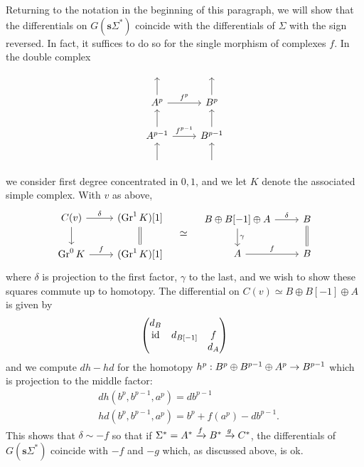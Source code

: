 \documentclass[deligne.tex]{subfiles}
\begin{document}
Returning to the notation in the beginning of this paragraph, we will show
that the differentials on $G(\mathbf s\Sigma^*)$ coincide with the
differentials of $\Sigma$ with the sign reversed. In fact, it suffices to
do so for the single morphism of complexes $f$. In the double complex
\begin{equation*}\begin{tikzcd}
	\;&\; \\
	A^p\arrow[r,"f^p"]\arrow[u]&B^p\arrow[u] \\
	A^{p-1}\arrow[u]\arrow[r,"f^{p-1}"]&B^{p-1}\arrow[u] \\
	\;\arrow[u]&\;\arrow[u]
\end{tikzcd}\end{equation*}
we consider first degree concentrated in $0,1$, and we let $K$ denote the
associated simple complex. With $v$ as above,
\begin{equation*}\begin{tikzcd}
	C(v)\arrow[r,"\delta"]\arrow[d]&(\Gr^1K)[1]\arrow[d,equals] \\
	\Gr^0K\arrow[r,"f"]&(\Gr^1K)[1]
\end{tikzcd}\quad\simeq\quad
\begin{tikzcd}
	B\oplus B[-1]\oplus A
	\arrow[r,"\delta"]\arrow[d,"\gamma"]
	&B\arrow[d,equals] \\
	A\arrow[r,"f"]&B
\end{tikzcd}
\end{equation*}
where $\delta$ is projection to the first factor, $\gamma$ to the last,
and we wish to show these squares commute up to homotopy.
The differential on $C(v)\simeq B\oplus B[-1]\oplus A$ is given by
\begin{equation*}\begin{pmatrix}
	d_B \\
	\operatorname{id}&d_{B[-1]}&f\\
	&&d_A
\end{pmatrix}\end{equation*}
and we compute $dh-hd$ for the homotopy
$h^p:B^p\oplus B^{p-1}\oplus A^p\rightarrow B^{p-1}$ which is projection to the 
middle factor:
\begin{align*}
	&dh(b^p,b^{p-1},a^p)=db^{p-1} \\
	&hd(b^p,b^{p-1},a^p)=b^p+f(a^p)-db^{p-1}.
\end{align*}
This shows that $\delta\sim-f$ so that
if $\Sigma^*=A^*\xrightarrow f B^*\xrightarrow g C^*$, the differentials of
$G(\mathbf s\Sigma^*)$ coincide with $-f$ and $-g$ which, as discussed above, is ok.
\end{document}
